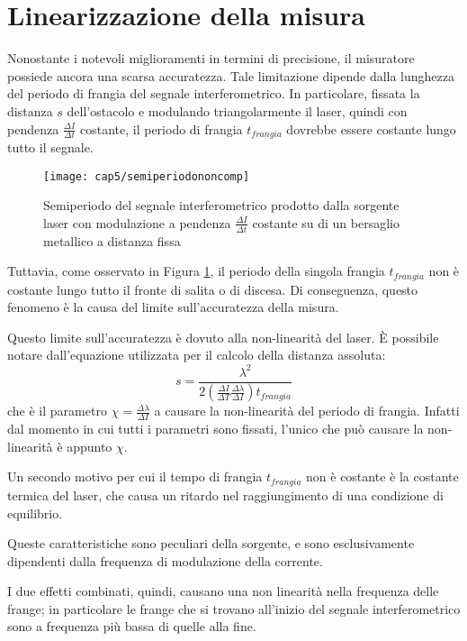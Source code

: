 \section{Linearizzazione della misura}
Nonostante i notevoli miglioramenti in termini di precisione, il misuratore possiede ancora una scarsa accuratezza. Tale limitazione dipende dalla lunghezza del periodo di frangia del segnale interferometrico. In particolare, fissata la distanza $s$ dell'ostacolo e modulando triangolarmente il laser, quindi con pendenza $\frac{\Delta I}{\Delta t}$ costante, il periodo di frangia $t_{frangia}$ dovrebbe essere costante lungo tutto il segnale. 
\begin{figure}  
  \begin{center}
    \texttt{[image: cap5/semiperiodononcomp]}
    \caption{Semiperiodo del segnale interferometrico prodotto dalla sorgente laser con modulazione a pendenza $\frac{\Delta I}{\Delta t}$ costante su di un bersaglio metallico a distanza fissa}
    \label{semiperiodononcomp}
  \end{center}
\end{figure}

Tuttavia, come osservato in Figura \ref{semiperiodononcomp}, il periodo della singola frangia $t_{frangia}$ non è costante lungo tutto il fronte di salita o di discesa. Di conseguenza, questo fenomeno è la causa del limite sull'accuratezza della misura.

Questo limite sull'accuratezza è dovuto alla non-linearità del laser. È possibile notare dall'equazione utilizzata per il calcolo della distanza assoluta: 
\begin{equation}
	s = \frac{\lambda^2}{2\left ( \frac{\Delta I}{\Delta T} \frac{\Delta \lambda}{\Delta I} \right ) t_{frangia}} 
\end{equation}
che è il parametro $\chi = \frac{\Delta \lambda}{\Delta I}$ a causare la non-linearità del periodo di frangia. Infatti dal momento in cui tutti i parametri sono fissati, l'unico che può causare la non-linearità è appunto $\chi$.

Un secondo motivo per cui il tempo di frangia $t_{frangia}$ non è costante è la costante termica del laser, che causa un ritardo nel raggiungimento di una condizione di equilibrio.

Queste caratteristiche sono peculiari della sorgente, e sono esclusivamente dipendenti dalla frequenza di modulazione della corrente.	

I due effetti combinati, quindi, causano una non linearità nella frequenza delle frange; in particolare le frange che si trovano all'inizio del segnale interferometrico sono a frequenza più bassa di quelle alla fine.	

